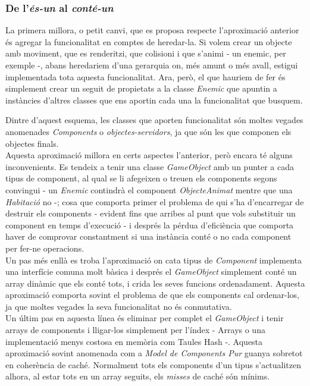\begin{description}
\end{description}

\subsubsection{De l'{\em és-un} al {\em conté-un}}

La primera millora, o petit canvi, que es proposa respecte l'aproximació anterior és agregar la funcionalitat en comptes de heredar-la. Si volem crear un objecte amb moviment, que es renderitzi, que colisioni i que s'animi - un enemic, per exemple -, abans heredariem d'una gerarquia on, més amunt o més avall, estigui implementada tota aquesta funcionalitat. Ara, però, el que hauriem de fer és simplement crear un seguit de propietats a la classe {\em Enemic} que apuntin a instàncies d'altres classes que ens aportin cada una la funcionalitat que busquem.

Dintre d'aquest esquema, les classes que aporten funcionalitat són moltes vegades anomenades {\em Components} o {\em objectes-servidors}, ja que són les que componen els objectes finals.
\\

Aquesta aproximació millora en certs aspectes l'anterior, però encara té alguns inconvenients. Es tendeix a tenir una classe {\em GameObject} amb un punter a cada tipus de component, al qual se li afegeixen o treuen els components segons convingui - un {\em Enemic} contindrà el component {\em ObjecteAnimat} mentre que una {\em Habitació} no -; cosa que comporta primer el problema de qui s'ha d'encarregar de destruir els components - evident fins que arribes al punt que vols substituir un component en temps d'execució - i després la pérdua d'eficiència que comporta haver de comprovar constantment si una instància conté o no cada component per fer-ne operacions.
\\

Un pas més enllà es troba l'aproximació on cata tipus de {\em Component} implementa una interfície comuna molt bàsica i després el {\em GameObject} simplement conté un array dinàmic que els conté tots, i crida les seves funcions ordenadament. Aquesta aproximació comporta sovint el problema de que els components cal ordenar-los, ja que moltes vegades la seva funcionalitat no és conmutativa.
\\

Un últim pas en aquesta línea és eliminar per complet el {\em GameObject} i tenir arrays de components i lligar-los simplement per l'índex - Arrays o una implementació menys costosa en memòria com Taules Hash -. Aquesta aproximació sovint anomenada com a {\em Model de Components Pur} guanya sobretot en coherència de caché. Normalment tots els components d'un tipus s'actualitzen alhora, al estar tots en un array seguits, els {\em misses} de caché són mínims.
\\

